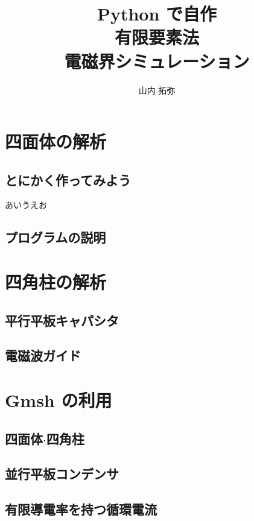 \documentclass[a4j]{jsbook}
\title{Python で自作\\有限要素法\\電磁界シミュレーション}
\author{山内 拓弥}
\date{}
\begin{document}
\maketitle

\tableofcontents

\chapter{四面体の解析}

\section{とにかく作ってみよう}
あいうえお

\section{プログラムの説明}



\chapter{四角柱の解析}

\section{平行平板キャパシタ}

\section{電磁波ガイド}

\chapter{Gmsh の利用}

\section{四面体$\cdot$四角柱}

\section{並行平板コンデンサ}

\section{有限導電率を持つ循環電流}
\end{document}
